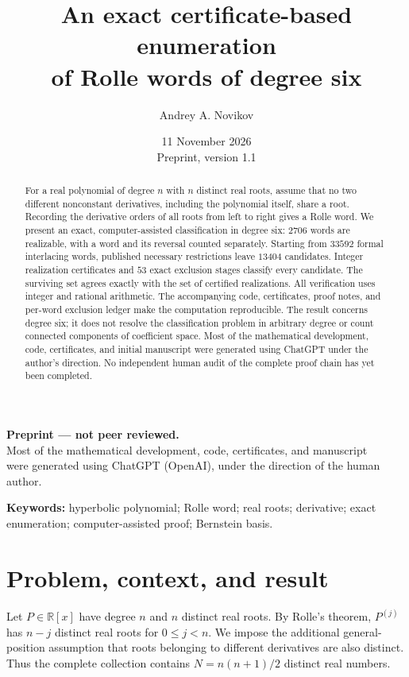 \documentclass[11pt]{article}
\title{An exact certificate-based enumeration\\of Rolle words of degree six}
\author{Andrey A. Novikov}
\date{11 November 2026\\\small Preprint, version 1.1}
\theoremstyle{definition}
\newcommand{\R}{\mathbb R}
\begin{document}
\maketitle
\begin{center}\small\textbf{Preprint --- not peer reviewed.}\\
Most of the mathematical development, code, certificates, and manuscript\\
were generated using ChatGPT (OpenAI), under the direction of the human author.
\end{center}
\begin{abstract}
For a real polynomial of degree $n$ with $n$ distinct real roots, assume
that no two different nonconstant derivatives, including the polynomial
itself, share a root. Recording the derivative orders of all roots from
left to right gives a Rolle word. We present an exact, computer-assisted
classification in degree six: $2706$ words are realizable, with a word
and its reversal counted separately. Starting from $33592$ formal
interlacing words, published necessary restrictions leave $13404$
candidates. Integer realization certificates and $53$ exact exclusion
stages classify every candidate. The surviving set agrees exactly with
the set of certified realizations. All verification uses integer and
rational arithmetic. The accompanying code, certificates, proof notes,
and per-word exclusion ledger make the computation reproducible.
The result concerns degree six; it does not resolve the classification
problem in arbitrary degree or count connected components of coefficient
space. Most of the mathematical development, code, certificates, and
initial manuscript were generated using ChatGPT under the author's
direction. No independent human audit of the complete proof chain has
yet been completed.
\end{abstract}
\noindent\textbf{Keywords:} hyperbolic polynomial; Rolle word; real roots;
derivative; exact enumeration; computer-assisted proof; Bernstein basis.

\section{Problem, context, and result}

Let $P\in\R[x]$ have degree $n$ and $n$ distinct real roots. By Rolle's
theorem, $P^{(j)}$ has $n-j$ distinct real roots for $0\le j<n$.
We impose the additional general-position assumption that roots belonging
to different derivatives are also distinct. Thus the complete collection
contains $N=n(n+1)/2$ distinct real numbers.
\end{document}
